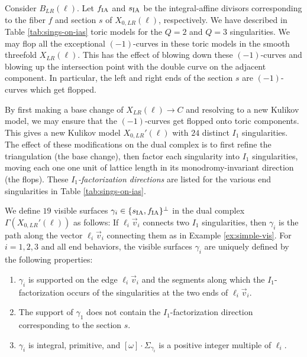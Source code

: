 \documentclass[table,x11names]{amsart}
\begin{document}
Consider $B_{LR}(\ell)$. Let $f_{{\rm IA}}$ and $s_{{\rm IA}}$ be the
 integral-affine divisors corresponding
 to the fiber $f$ and section $s$ of $X_{0,LR}(\ell)$, respectively. We have described
 in Table \ref{tab:sings-on-ias} toric models for the $Q=2$ and $Q=3$ singularities.
 We may flop all the exceptional $(-1)$-curves in these toric models in the
 smooth threefold $X_{LR}(\ell)$.
 This has the effect of blowing down these $(-1)$-curves
 and blowing up the intersection point with the double curve
 on the adjacent component. 
 In particular, the left and
 right ends of the section $s$ are $(-1)$-curves which get flopped.

By first making a base change of $X_{LR}(\ell)\rightarrow C$ and resolving to a
new Kulikov model, we may ensure that the $(-1)$-curves get flopped onto toric components.
 This gives a new Kulikov model $X_{0,LR}'(\ell)$ with $24$ distinct $I_1$ singularities.
  The effect of these modifications on the dual complex is to first refine
  the triangulation (the base change), then factor each singularity
 into $I_1$ singularities, moving each one one unit of lattice length in its
 monodromy-invariant direction (the flops). These {\it $I_1$-factorization directions}
 are listed for the various end singularities in Table \ref{tab:sings-on-ias}.
 
 \begin{definition} We define $19$ visible surfaces $\gamma_i\in \{s_{{\rm IA}},f_{{\rm IA}}\}^\perp$
 in the dual complex $\Gamma(X_{0,LR}'(\ell))$
 as follows: If $\ell_i\vec{v}_i$ connects two $I_1$ singularities,
 then $\gamma_i$ is the path along the vector $\ell_i\vec{v}_i$
 connecting them as in Example \ref{ex:simple-vis}. For $i=1,2,3$ and all end behaviors,
 the visible surfaces $\gamma_i$ are uniquely defined by the following properties:
 \begin{enumerate}
 \item $\gamma_i$ is supported on the edge $\ell_i\vec{v}_i$ and the segments along
 which the $I_1$-factorization occurs of the singularities at the two ends of $\ell_i\vec{v}_i$.
\item The support of $\gamma_1$ does not contain the $I_1$-factorization
 direction corresponding to the section $s$.
 \item $\gamma_i$ is integral, primitive, and
 $[\omega]\cdot \Sigma_{\gamma_i}$ is a positive integer multiple of $\ell_i$.
 \end{enumerate}

 \end{definition}
 
\end{document}
